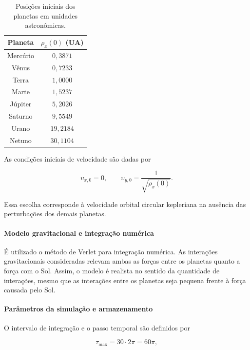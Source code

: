 \documentclass[12pt,a4paper]{article}
\begin{document}
\begin{table}[htbp]
    \centering
    \caption{Posições iniciais dos planetas em unidades astronômicas.}
    \label{tab:posicoes-planetas}
    \begin{tabular}{c c}
        \hline
        Planeta & $\rho_x(0)$ (UA) \\
        \hline
        Mercúrio & $0,3871$ \\
        Vênus & $0,7233$ \\
        Terra & $1,0000$ \\
        Marte & $1,5237$ \\
        Júpiter & $5,2026$ \\
        Saturno & $9,5549$ \\
        Urano & $19,2184$ \\
        Netuno & $30,1104$ \\
        \hline
    \end{tabular}
\end{table}

As condições iniciais de velocidade são dadas por

\begin{equation}
    \upsilon_{x,0}=0,
    \qquad
    \upsilon_{y,0}=\frac{1}{\sqrt{\rho_x(0)}}.
\end{equation}

Essa escolha corresponde à velocidade orbital circular kepleriana na ausência das perturbações dos demais planetas.

\paragraph{Modelo gravitacional e integração numérica}

É utilizado o método de Verlet para integração numérica. As interações gravitacionais consideradas relevam ambas as forças entre os planetas quanto a força com o Sol. 
Assim, o modelo é realista no sentido da quantidade de interações, mesmo que as interações entre os planetas seja pequena frente à força causada pelo Sol.
\paragraph{Parâmetros da simulação e armazenamento}

O intervalo de integração e o passo temporal são definidos por

\begin{equation}
    \tau_{\max}=30\cdot2\pi=60\pi,
\end{equation}
\end{document}
